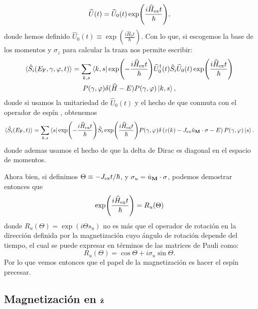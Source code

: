 \begin{equation}%
	\widehat{U}(t) = \widehat{U}_0(t)\exp(\frac{i\widehat{H}_{\rm ex}t}{\hbar}), 
\end{equation}
donde hemos definido $\widehat{U}_0(t)\equiv\exp(\frac{i\widehat{H}_{0}t}{\hbar})$. Con lo que, si escogemos la base de los momentos y $\sigma_z$ para calcular la traza nos permite escribir:
\begin{multline}
	\langle \hat{S}_i(E_{\rm{F}},\gamma,\varphi,t) \rangle = \sum_{k, s} \bra{k, s}\exp(-\frac{i\widehat{H}_{\rm ex}t}{\hbar})\widehat{U}^\dagger_0(t)\hat{S}_i \widehat{U}_0(t)\exp(\frac{i\widehat{H}_{\rm ex}t}{\hbar}) \\ P(\gamma,\varphi)\delta(\widehat{H} - E)P(\gamma,\varphi)\ket{k, s},
\end{multline}
donde si usamos la unitariedad de $\widehat{U}_0(t)$ y el hecho de que conmuta con el operador de espín , obtenemos
\begin{equation}
	\langle \hat{S}_i(E_{\rm{F}},t) \rangle = \sum_{k, s} \bra{ s}\exp(-\frac{i\widehat{H}_{\rm ex}t}{\hbar})\hat{S}_i \exp(\frac{i\widehat{H}_{\rm ex}t}{\hbar}) P(\gamma,\varphi)\delta\left (\varepsilon(k) -J_{\rm ex} \hat{u}_{\textbf{M}}\cdot \vb{\sigma}  -E\right)P(\gamma,\varphi) \ket{s}.
\end{equation}
donde ademas usamos el hecho de que la delta de Dirac es diagonal en el espacio de momentos.

Ahora bien, si definimos $\Theta \equiv -J_{\rm ex} t /\hbar$, y $\sigma_u = \hat{u}_{\textbf{M}}\cdot \vb{\sigma}$, podemos demostrar entonces que 
\begin{equation}
	\exp(\frac{i\widehat{H}_{\rm ex}t}{\hbar}) = R_u(\Theta)  
\end{equation}
donde $R_u(\Theta)= \exp(i\Theta s_u )$ no es más que el operador de rotación en la dirección definida por la magnetización cuyo ángulo de rotación depende del tiempo, el cual se puede expresar en términos de las matrices de Pauli como:
\begin{equation}
	R_u(\Theta) = \cos \Theta  +i \sigma_{u}\sin\Theta . 
\end{equation}
Por lo que vemos entonces que el papel de la magnetización es hacer el espín precesar. 

\subsection{Magnetización en $ \hat{\vb z} $}

